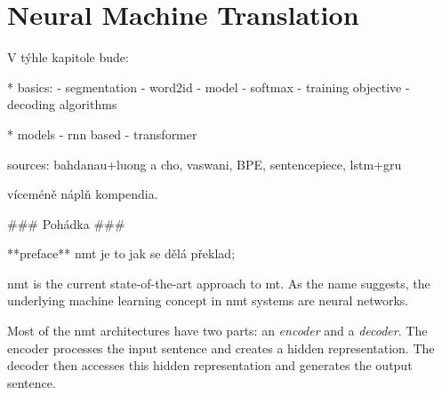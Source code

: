 \chapter{Neural Machine Translation}
\label{chap:nmt}

\begin{markdown}
V týhle kapitole bude:

* basics:
    - segmentation
    - word2id
    - model
    - softmax
    - training objective
    - decoding algorithms

* models
    - rnn based
    - transformer

sources:
bahdanau+luong a cho, vaswani, BPE, sentencepiece, lstm+gru

víceméně náplň kompendia.


### Pohádka ###

**preface**
\gls{nmt} je to jak se dělá překlad;


\end{markdown}


\gls{nmt} is the current state-of-the-art approach to \gls{mt}. As the name
suggests, the underlying machine learning concept in \gls{nmt} systems are
neural networks.

Most of the \gls{nmt} architectures have two parts: an \emph{encoder} and a
\emph{decoder}. The encoder processes the input sentence and creates a hidden
representation. The decoder then accesses this hidden representation and
generates the output sentence.



\begin{markdown}

\end{markdown}